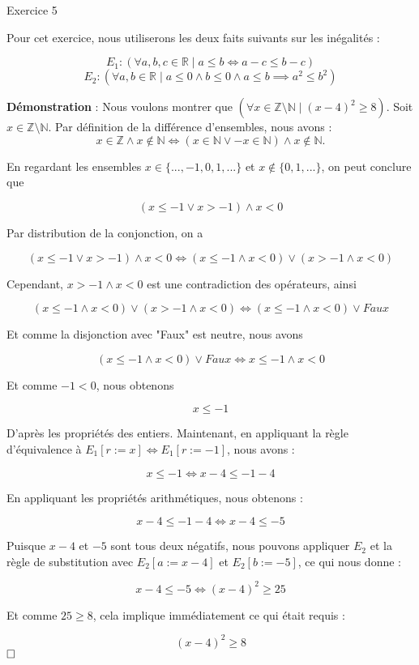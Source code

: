\documentclass{article}
\begin{document}
Exercice 5

\vspace{0.5cm}
Pour cet exercice, nous utiliserons les deux faits suivants sur les inégalités :

$$E_1 : (\forall a,b,c \in \mathbb{R} \mid a \leq b \iff a - c \leq b - c)$$
$$E_2 : (\forall a,b \in \mathbb{R} \mid a \leq 0 \land b \leq 0 \land a \leq b \implies a^2 \leq b^2)$$

\textbf{Démonstration} : Nous voulons montrer que $(\forall x \in \mathbb{Z} \setminus \mathbb{N} \mid (x - 4)^2 \geq 8)$. Soit $x \in \mathbb{Z} \setminus \mathbb{N}$. Par définition de la différence d'ensembles, nous avons :
$$x \in \mathbb{Z} \land x \notin \mathbb{N} \iff (x \in \mathbb{N} \lor -x \in \mathbb{N}) \land x \notin \mathbb{N}.$$

En regardant les ensembles $x \in \{..., -1, 0, 1, ...\}$ et $x \notin \{0, 1, ...\}$, on peut conclure que 

$$ (x \leq -1 \lor x > -1) \land x < 0 $$

Par distribution de la conjonction, on a 

$$ (x \leq -1 \lor x > -1) \land x < 0 \iff (x \leq -1 \land x < 0) \lor (x > -1 \land x < 0) $$

Cependant, $x > -1 \land x < 0$ est une contradiction des opérateurs, ainsi

$$ (x \leq -1 \land x < 0) \lor (x > -1 \land x < 0) \iff (x \leq -1 \land x < 0) \lor Faux $$

Et comme la disjonction avec "Faux" est neutre, nous avons 

$$ (x \leq -1 \land x < 0) \lor Faux \iff x \leq -1 \land x < 0 $$

Et comme $-1 < 0$, nous obtenons 

$$ x \leq -1 $$

D'après les propriétés des entiers. Maintenant, en appliquant la règle d'équivalence à $E_1[r := x] \iff E_1[r := -1]$, nous avons :

$$ x \leq -1 \iff x - 4 \leq -1 - 4 $$

En appliquant les propriétés arithmétiques, nous obtenons :

$$ x - 4 \leq -1 - 4 \iff x - 4 \leq -5 $$

Puisque $x - 4$ et $-5$ sont tous deux négatifs, nous pouvons appliquer $E_2$ et la règle de substitution avec $E_2[a := x-4]$ et $E_2[b := -5]$, ce qui nous donne :

$$ x - 4 \leq -5 \iff (x - 4)^2 \geq 25 $$

Et comme $25 \geq 8$, cela implique immédiatement ce qui était requis :

$$ (x - 4)^2 \geq 8 $$
$\hfill \square$
\end{document}
